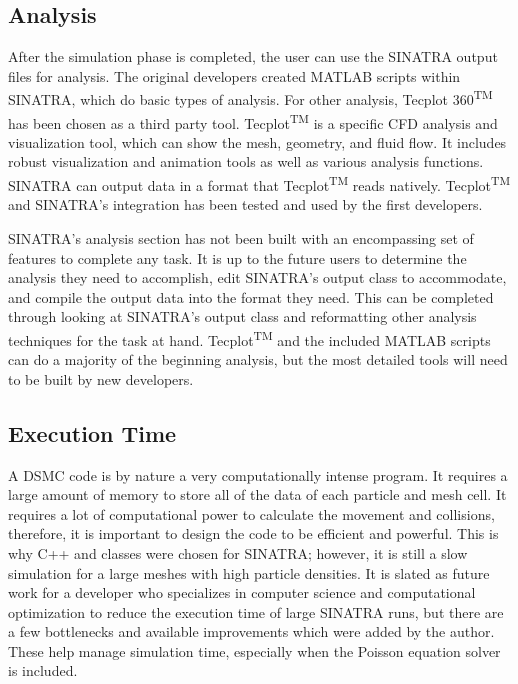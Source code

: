 

\subsection{Analysis}


 After the simulation phase is completed, the user can use the SINATRA output files for analysis. The original developers created MATLAB scripts within SINATRA, which do basic types of analysis. For other analysis, Tecplot 360\textsuperscript{TM} \cite{tecplot} has been chosen as a third party tool. Tecplot\textsuperscript{TM} is a specific CFD analysis and visualization tool, which can show the mesh, geometry, and fluid flow. It includes robust visualization and animation tools as well as various analysis functions. SINATRA can output data in a format that Tecplot\textsuperscript{TM} reads natively. Tecplot\textsuperscript{TM} and SINATRA’s integration has been tested and used by the first developers.\par
 \indent SINATRA’s analysis section has not been built with an encompassing set of features to complete any task. It is up to the future users to determine the analysis they need to accomplish, edit SINATRA’s output class to accommodate, and compile the output data into the format they need. This can be completed through looking at SINATRA’s output class and reformatting other analysis techniques for the task at hand. Tecplot\textsuperscript{TM} and the included MATLAB scripts can do a majority of the beginning analysis, but the most detailed tools will need to be built by new developers.

 
\subsection{Execution Time}
A DSMC code is by nature a very computationally intense program. It requires a large amount of memory to store all of the data of each particle and mesh cell. It requires a lot of computational power to calculate the movement and collisions, therefore, it is important to design the code to be efficient and powerful. This is why C++ and classes were chosen for SINATRA; however, it is still a slow simulation for a large meshes with high particle densities. It is slated as future work for a developer who specializes in computer science and computational optimization to reduce the execution time of large SINATRA runs, but there are a few bottlenecks and available improvements which were added by the author. These help manage simulation time, especially when the Poisson equation solver is included. \par

